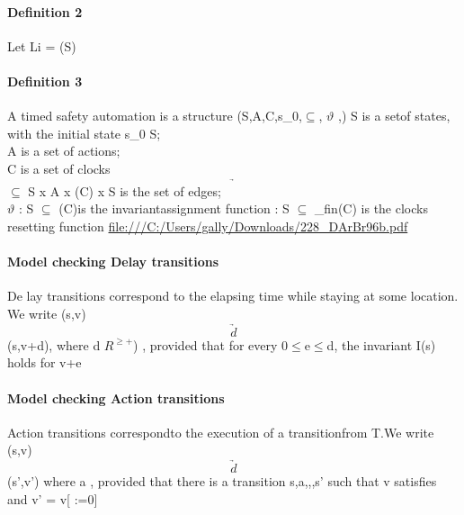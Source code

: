 \paragraph{Definition 2}
Let Li = (S)

\paragraph{Definition 3}
A timed safety automation is a structure (S,A,C,s_{0},$\subseteq$, $\vartheta$ ,\kappa)
S is a setof states, with the initial state s_{0} \in S; \\
A is a set of actions; \\
C is a set of clocks \\
 $$\underrightarrow{}  $$  $\subseteq$ S x A x \phi(C) x S is the set of edges; \\
$\vartheta$ : S $\subseteq$ \Phi(C)is the invariantassignment function
\kappa : S $\subseteq$ \varphi_{fin}(C) is the clocks resetting function
\url{file:///C:/Users/gally/Downloads/228_DArBr96b.pdf}
 
 \paragraph{Model checking Delay transitions}
 De lay transitions correspond to the  elapsing time while staying at some location. We write (s,v)  $$\underrightarrow{d}  $$ (s,v+d), where d \in $R^{ \geq +}$) , provided that for every 0$\le$e$\le$d, the invariant I(s) holds for v+e
\paragraph{Model checking Action transitions}
Action transitions correspondto the execution of a transitionfrom T.We write (s,v) $$\underrightarrow{d}  $$ (s',v') where a \in \Sigma, provided that there  is a transition \langle s,a,\phi,\lambda,s' \rangle such  that v satisfies \varphi and v' = v[ \lambda :=0]
 
 
% 
\Re \\
\patial \\

